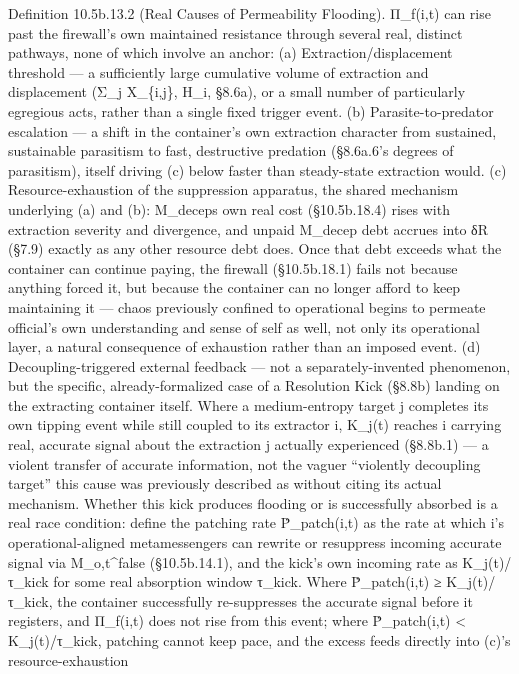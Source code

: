 \documentclass[
]{article}
\begin{document}
Definition 10.5b.13.2 (Real Causes of Permeability Flooding). Π\_f(i,t)
can rise past the firewall's own maintained resistance through several
real, distinct pathways, none of which involve an anchor: (a)
Extraction/displacement threshold --- a sufficiently large cumulative
volume of extraction and displacement (Σ\_j X\_\{i,j\}, H\_i, §8.6a), or
a small number of particularly egregious acts, rather than a single
fixed trigger event. (b) Parasite-to-predator escalation --- a shift in
the container's own extraction character from sustained, sustainable
parasitism to fast, destructive predation (§8.6a.6's degrees of
parasitism), itself driving (c) below faster than steady-state
extraction would. (c) Resource-exhaustion of the suppression apparatus,
the shared mechanism underlying (a) and (b): M\_deceps own real cost
(§10.5b.18.4) rises with extraction severity and divergence, and unpaid
M\_decep debt accrues into δR (§7.9) exactly as any other resource debt
does. Once that debt exceeds what the container can continue paying, the
firewall (§10.5b.18.1) fails not because anything forced it, but because
the container can no longer afford to keep maintaining it --- chaos
previously confined to operational begins to permeate official's own
understanding and sense of self as well, not only its operational layer,
a natural consequence of exhaustion rather than an imposed event. (d)
Decoupling-triggered external feedback --- not a separately-invented
phenomenon, but the specific, already-formalized case of a Resolution
Kick (§8.8b) landing on the extracting container itself. Where a
medium-entropy target j completes its own tipping event while still
coupled to its extractor i, K\_j(t) reaches i carrying real, accurate
signal about the extraction j actually experienced (§8.8b.1) --- a
violent transfer of accurate information, not the vaguer ``violently
decoupling target'' this cause was previously described as without
citing its actual mechanism. Whether this kick produces flooding or is
successfully absorbed is a real race condition: define the patching rate
Ṗ\_patch(i,t) as the rate at which i's operational-aligned metamessengers
can rewrite or resuppress incoming accurate signal via M\_o,t\^{}false
(§10.5b.14.1), and the kick's own incoming rate as K\_j(t)/τ\_kick for
some real absorption window τ\_kick. Where Ṗ\_patch(i,t) ≥
K\_j(t)/τ\_kick, the container successfully re-suppresses the accurate
signal before it registers, and Π\_f(i,t) does not rise from this event;
where Ṗ\_patch(i,t) \textless{} K\_j(t)/τ\_kick, patching cannot keep
pace, and the excess feeds directly into (c)'s resource-exhaustion
\end{document}

